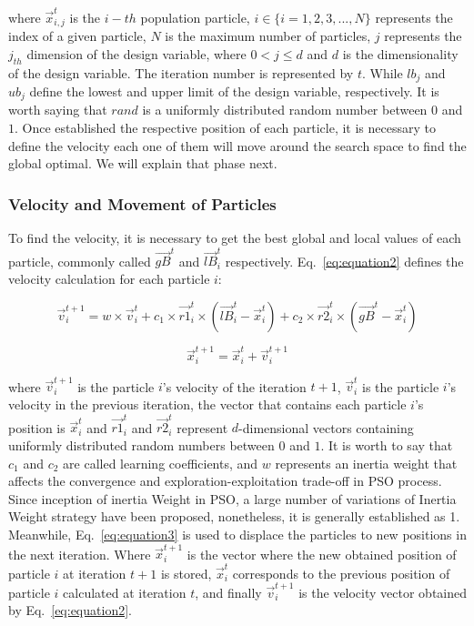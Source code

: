 \noindent where $\vec{x}_{i,j}^t$ is the $i-th$ population particle, $i \in \{i=1,2,3,...,N\}$ represents the index of a given particle, $N$ is the maximum number of particles, $j$ represents the $j_{th}$ dimension of the design variable, where $0<j\leq d$ and $d$ is the dimensionality of the design variable. The iteration number is represented by $t$. While $lb_j$ and $ub_j$ define the lowest and upper limit of the design variable, respectively. It is worth saying that $rand$ is a uniformly distributed random number between $0$ and $1$. Once established the respective position of each particle, it is necessary to define the velocity each one of them will move around the search space to find the global optimal. We will explain that phase next.

\subsubsection{Velocity and Movement of Particles}

To find the velocity, it is necessary to get the best global and local values of each particle, commonly called $\vec{gB}^t$ and $\vec{lB}_i^t$ respectively. Eq.~\ref{eq:equation2} defines the velocity calculation for each particle $i$:

\begin{equation}
\vec{v}_i^{t+1}=w \times \vec{v}_i^{t}+c_{1} \times \vec{r1}_i^t \times (\vec{lB}_i^t-\vec{x}^{t}_i)+c_{2} \times \vec{r2}_i^t \times (\vec{gB}^t-\vec{x}^{t}_i)
\label{eq:equation2}
\end{equation}

\begin{equation}
\vec{x}_i^{t+1}=\vec{x}_i^{t}+\vec{v}_i^{t+1}
\label{eq:equation3}
\end{equation}

\noindent where $\vec{v}_i^{t+1}$ is the particle $i$'s velocity of the iteration $t+1$, $\vec{v}_i^{t}$ is the particle $i$'s velocity in the previous iteration, the vector that contains each particle $i$'s position is $\vec{x}_i^{t}$ and $\vec{r1}_i^t$ and $\vec{r2}_i^t$ represent $d$-dimensional vectors containing uniformly distributed random numbers between $0$ and $1$. It is worth to say that $c_{1}$ and $c_{2}$ are called learning coefficients, and $w$ represents an inertia weight that affects the convergence and exploration-exploitation trade-off in PSO process. Since inception of inertia Weight in PSO, a large number of variations of Inertia Weight strategy have been proposed, nonetheless, it is generally established as 1. Meanwhile, Eq.~\ref{eq:equation3} is used to displace the particles to new positions in the next iteration. Where $\vec{x}_i^{t+1}$ is the vector where the new obtained position of particle $i$ at iteration $t+1$ is stored, $\vec{x}_i^{t}$ corresponds to the previous position of particle $i$ calculated at iteration $t$, and finally $\vec{v}_i^{t+1}$ is the velocity vector obtained by Eq.~\ref{eq:equation2}.

